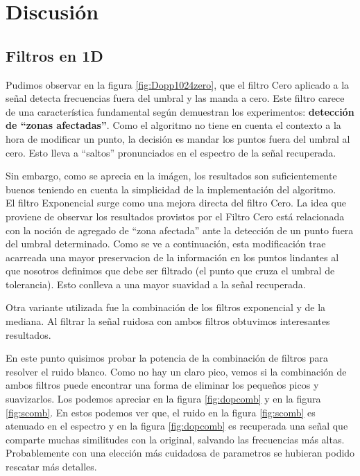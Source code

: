 \section{Discusi\'on}

\subsection{Filtros en 1D}

Pudimos observar en la figura \ref{fig:Dopp1024zero}, que el filtro Cero
aplicado a la se\~nal detecta frecuencias fuera del umbral y
las manda a cero. Este filtro carece de una caracter\'istica fundamental
seg\'un demuestran los experimentos:
{\bf detecci\'on de ``zonas afectadas''}. Como el algoritmo no tiene en
cuenta el contexto a la hora de modificar un punto, la decisi\'on es mandar los
puntos fuera del umbral al cero. Esto lleva a ``saltos'' pronunciados en
el espectro de la se\~nal recuperada.

Sin embargo, como se aprecia en la im\'agen, los resultados son suficientemente
buenos teniendo en cuenta la simplicidad de la implementaci\'on del algoritmo.\\

El filtro Exponencial surge como una mejora directa del filtro Cero.
La idea que proviene de observar los resultados provistos por el Filtro Cero est\'a relacionada con la
noci\'on de agregado de ``zona afectada'' ante la detecci\'on de un punto fuera
del umbral determinado. Como se ve a continuaci\'on, esta modificaci\'on trae
acarreada una mayor preservacion de la informaci\'on en los puntos lindantes al que nosotros
definimos que debe ser filtrado (el punto que cruza el umbral de tolerancia). Esto conlleva 
a una mayor suavidad a la se\~nal recuperada.



Otra variante utilizada fue la combinaci\'on de los filtros exponencial y
de la mediana. Al filtrar la se\~nal ruidosa con ambos filtros obtuvimos interesantes
resultados.

En este punto quisimos probar la potencia de la combinaci\'on de filtros para resolver
el ruido blanco. Como no hay un claro pico, vemos si la combinaci\'on de ambos
filtros puede encontrar una forma de eliminar los peque\~nos picos y suavizarlos.
Los podemos apreciar en la figura \ref{fig:dopcomb} y en la figura \ref{fig:scomb}.
En estos podemos ver que, el ruido en la figura \ref{fig:scomb} es atenuado
en el espectro y en la figura \ref{fig:dopcomb} es recuperada una se\~nal que
comparte muchas similitudes con la original, salvando las frecuencias
m\'as altas. Probablemente con una elecci\'on m\'as cuidadosa de parametros
se hubieran podido rescatar m\'as detalles.

